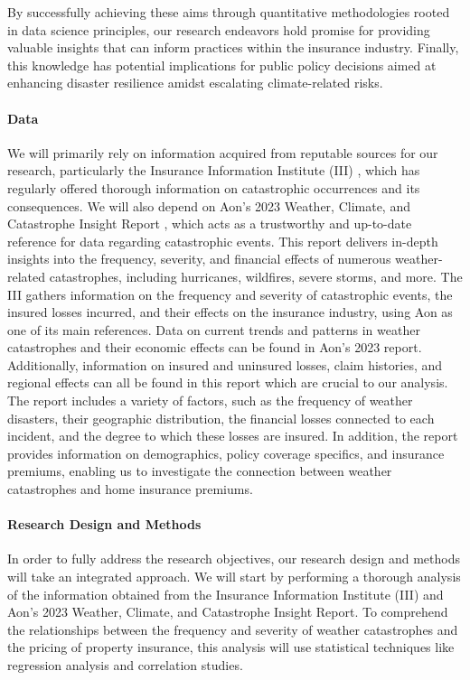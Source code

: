\documentclass[12pt]{article}
\begin{document}
By successfully achieving these aims through quantitative methodologies rooted in data science principles, our research endeavors 
hold promise for providing valuable insights that can inform practices within the insurance industry. Finally, this knowledge has 
potential implications for public policy decisions aimed at enhancing disaster resilience amidst escalating climate-related risks.


\paragraph{Data}
We will primarily rely on information acquired from reputable sources for our research, particularly the Insurance Information 
Institute (III) \cite{iii}, which has regularly offered thorough information on catastrophic occurrences and its consequences. We will also 
depend on Aon's 2023 Weather, Climate, and Catastrophe Insight Report \cite{aon}, which acts as a trustworthy and up-to-date reference for data 
regarding catastrophic events. This report delivers in-depth insights into the frequency, severity, and financial effects of numerous 
weather-related catastrophes, including hurricanes, wildfires, severe storms, and more. The III gathers information on the frequency 
and severity of catastrophic events, the insured losses incurred, and their effects on the insurance industry, using Aon as one of 
its main references. Data on current trends and patterns in weather catastrophes and their economic effects can be found in Aon's 
2023 report. Additionally, information on insured and uninsured losses, claim histories, and regional effects can all be found in 
this report which are crucial to our analysis. The report includes a variety of factors, such as the frequency of weather disasters, 
their geographic distribution, the financial losses connected to each incident, and the degree to which these losses are insured. 
In addition, the report provides information on demographics, policy coverage specifics, and insurance premiums, enabling us to 
investigate the connection between weather catastrophes and home insurance premiums.

\paragraph{Research Design and Methods}
In order to fully address the research objectives, our research design and methods will take an integrated approach. We will start by 
performing a thorough analysis of the information obtained from the Insurance Information Institute (III) \cite{iii}and Aon's 2023 Weather, 
Climate, and Catastrophe Insight Report\cite{aon}. To comprehend the relationships between the frequency and severity of weather catastrophes 
and the pricing of property insurance, this analysis will use statistical techniques like regression analysis and correlation studies. 
\end{document}
